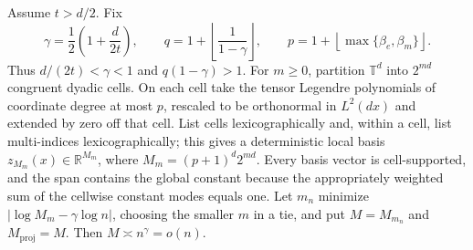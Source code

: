 Assume \(t>d/2\).  Fix
\[
 \gamma=\frac12\left(1+\frac{d}{2t}\right),
 \qquad
 q=1+\left\lfloor\frac{1}{1-\gamma}\right\rfloor,
 \qquad
 p=1+\left\lfloor\max\{\beta_e,\beta_m\}\right\rfloor .
\]
Thus \(d/(2t)<\gamma<1\) and \(q(1-\gamma)>1\).  For \(m\geq0\), partition \(\mathbb T^d\) into \(2^{md}\) congruent dyadic cells.  On each cell take the tensor Legendre polynomials of coordinate degree at most \(p\), rescaled to be orthonormal in \(L^2(dx)\) and extended by zero off that cell.  List cells lexicographically and, within a cell, list multi-indices lexicographically; this gives a deterministic local basis \(z_{M_m}(x)\in\mathbb R^{M_m}\), where \(M_m=(p+1)^d2^{md}\).  Every basis vector is cell-supported, and the span contains the global constant because the appropriately weighted sum of the cellwise constant modes equals one.  Let \(m_n\) minimize \(|\log M_m-\gamma\log n|\), choosing the smaller \(m\) in a tie, and put \(M=M_{m_n}\) and \(M_{\mathrm{proj}}=M\).  Then \(M\asymp n^\gamma=o(n)\).

